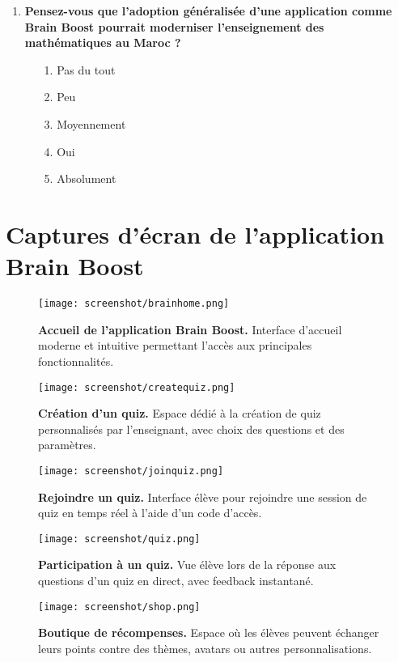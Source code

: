 \documentclass[a4paper,11pt]{report}
\begin{document}
\begin{enumerate}
    \item \textbf{Pensez-vous que l'adoption généralisée d'une application comme Brain Boost pourrait moderniser l'enseignement des mathématiques au Maroc ?}
    \begin{itemize}
        \item[1.] Pas du tout
        \item[2.] Peu
        \item[3.] Moyennement
        \item[4.] Oui
        \item[5.] Absolument
    \end{itemize}

\end{enumerate}

\section{Captures d'écran de l'application Brain Boost}

\begin{figure}[H]
    \centering
    \texttt{[image: screenshot/brainhome.png]}
    \caption{\textbf{Accueil de l'application Brain Boost.} Interface d'accueil moderne et intuitive permettant l'accès aux principales fonctionnalités.}
\end{figure}

\begin{figure}[H]
    \centering
    \texttt{[image: screenshot/createquiz.png]}
    \caption{\textbf{Création d'un quiz.} Espace dédié à la création de quiz personnalisés par l'enseignant, avec choix des questions et des paramètres.}
\end{figure}

\begin{figure}[H]
    \centering
    \texttt{[image: screenshot/joinquiz.png]}
    \caption{\textbf{Rejoindre un quiz.} Interface élève pour rejoindre une session de quiz en temps réel à l'aide d'un code d'accès.}
\end{figure}

\begin{figure}[H]
    \centering
    \texttt{[image: screenshot/quiz.png]}
    \caption{\textbf{Participation à un quiz.} Vue élève lors de la réponse aux questions d'un quiz en direct, avec feedback instantané.}
\end{figure}

\begin{figure}[H]
    \centering
    \texttt{[image: screenshot/shop.png]}
    \caption{\textbf{Boutique de récompenses.} Espace où les élèves peuvent échanger leurs points contre des thèmes, avatars ou autres personnalisations.}
\end{figure}
\end{document}
